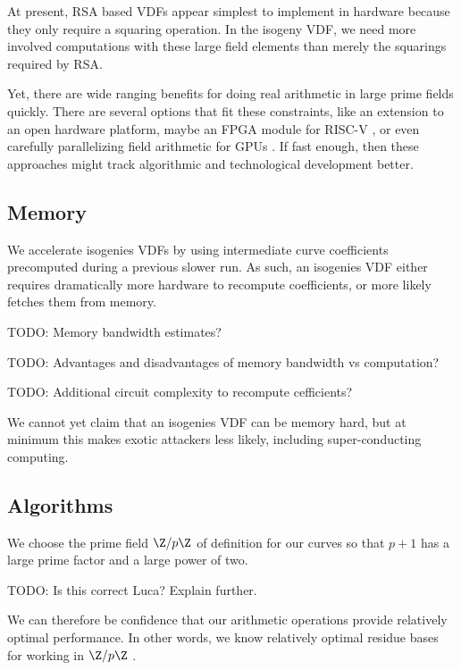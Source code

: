 \documentclass{article}
\begin{document}
At present, RSA based VDFs appear simplest to implement in hardware
because they only require a squaring operation. %
In the isogeny VDF, we need more involved computations with these
large field elements than merely the squarings required by RSA. 

Yet, there are wide ranging benefits for doing real arithmetic in
large prime fields quickly.  There are several options that fit these
constraints, like an extension to an open hardware platform, maybe an
FPGA module for RISC-V \cite{????}, or even carefully parallelizing
field arithmetic for GPUs \cite{????}. 
If fast enough, then these approaches might track algorithmic and
technological development better. 

\subsection{Memory}

We accelerate isogenies VDFs by using intermediate curve coefficients
precomputed during a previous slower run.  As such, an isogenies VDF
either requires dramatically more hardware to recompute coefficients,
or more likely fetches them from memory.  

TODO:  Memory bandwidth estimates?

TODO:  Advantages and disadvantages of memory bandwidth vs computation? 

TODO:  Additional circuit complexity to recompute cefficients?

We cannot yet claim that an isogenies VDF can be memory hard,
but at minimum this makes exotic attackers less likely, including
super-conducting computing.

\subsection{Algorithms}

We choose the prime field $\Z/p\Z$ of definition for our curves so
that $p+1$ has a large prime factor and a large power of two.  

TODO: Is this correct Luca?  Explain further.

We can therefore be confidence that our arithmetic operations provide
relatively optimal performance.  In other words, we know relatively
optimal residue bases for working in $\Z/p\Z$ \cite{????}.
\end{document}
